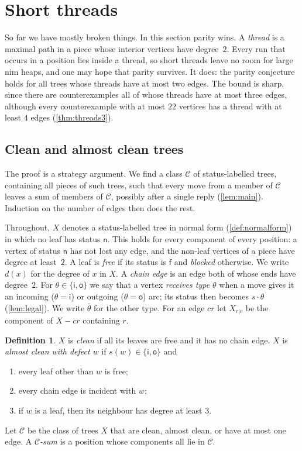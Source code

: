 \documentclass[11pt]{amsart}
\theoremstyle{definition}
\newtheorem{definition}[theorem]{Definition}
\theoremstyle{remark}
\newcommand{\sn}{\mathsf{n}}
\newcommand{\si}{\mathsf{i}}
\newcommand{\so}{\mathsf{o}}
\newcommand{\sff}{\mathsf{f}}
\begin{document}
\section{Short threads}\label{sec:threads}

So far we have mostly broken things. In this section parity wins. A \emph{thread} is a maximal path in a piece whose interior vertices have degree~$2$. Every run that occurs in a position lies inside a thread, so short threads leave no room for large nim heaps, and one may hope that parity survives. It does: the parity conjecture holds for all trees whose threads have at most two edges. The bound is sharp, since there are counterexamples all of whose threads have at most three edges, although every counterexample with at most $22$ vertices has a thread with at least $4$ edges (\cref{thm:threads3}).

\subsection{Clean and almost clean trees}
The proof is a strategy argument. We find a class $\mathcal C$ of status-labelled trees, containing all pieces of such trees, such that every move from a member of $\mathcal C$ leaves a sum of members of $\mathcal C$, possibly after a single reply (\cref{lem:main}). Induction on the number of edges then does the rest.

Throughout, $X$ denotes a status-labelled tree in normal form (\cref{def:normalform}) in which no
leaf has status $\sn$. This holds for every component of every position: a vertex of status $\sn$
has not lost any edge, and the non-leaf vertices of a piece have degree at least~$2$.
A leaf is \emph{free} if its status is $\sff$ and \emph{blocked} otherwise. We write $d(x)$ for the
degree of $x$ in $X$. A \emph{chain edge} is an edge both of whose ends have degree~$2$.
For $\theta\in\{\si,\so\}$ we say that a vertex \emph{receives type $\theta$} when a move gives it an
incoming ($\theta=\si$) or outgoing ($\theta=\so$) arc; its status then becomes $s\cdot\theta$
(\cref{lem:legal}). We write $\bar\theta$ for the other type.
For an edge $cr$ let $X_{r|c}$ be the component of $X-cr$ containing $r$.

\begin{definition}\label{def:clean}
$X$ is \emph{clean} if all its leaves are free and it has no chain edge.
$X$ is \emph{almost clean with defect $w$} if $s(w)\in\{\si,\so\}$ and
\begin{enumerate}[label=\textup{(C\arabic*)}]
\item every leaf other than $w$ is free;
\item every chain edge is incident with $w$;
\item if $w$ is a leaf, then its neighbour has degree at least $3$.
\end{enumerate}
Let $\mathcal C$ be the class of trees $X$ that are clean, almost clean, or have at most one edge.
A \emph{$\mathcal C$-sum} is a position whose components all lie in $\mathcal C$.
\end{definition}
\end{document}
